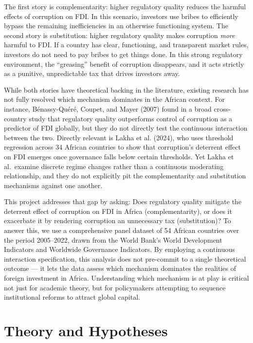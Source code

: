 \documentclass[
  12pt,
  letterpaper,
  DIV=11,
  numbers=noendperiod]{scrartcl}
\begin{document}
The first story is complementarity: higher regulatory quality reduces
the harmful effects of corruption on FDI. In this scenario, investors
use bribes to efficiently bypass the remaining inefficiencies in an
otherwise functioning system. The second story is substitution: higher
regulatory quality makes corruption \emph{more} harmful to FDI. If a
country has clear, functioning, and transparent market rules, investors
do not need to pay bribes to get things done. In this strong regulatory
environment, the ``greasing'' benefit of corruption disappears, and it
acts strictly as a punitive, unpredictable tax that drives investors
away.

While both stories have theoretical backing in the literature, existing
research has not fully resolved which mechanism dominates in the African
context. For instance, Bénassy-Quéré, Coupet, and Mayer (2007) found in
a broad cross-country study that regulatory quality outperforms control
of corruption as a predictor of FDI globally, but they do not directly
test the continuous interaction between the two. Directly relevant is
Lakha et al. (2024), who uses threshold regression across 34 African
countries to show that corruption's deterrent effect on FDI emerges once
governance falls below certain thresholds. Yet Lakha et al.~examine
discrete regime changes rather than a continuous moderating
relationship, and they do not explicitly pit the complementarity and
substitution mechanisms against one another.

This project addresses that gap by asking: Does regulatory quality
mitigate the deterrent effect of corruption on FDI in Africa
(complementarity), or does it exacerbate it by rendering corruption an
unnecessary tax (substitution)? To answer this, we use a comprehensive
panel dataset of 54 African countries over the period 2005--2022, drawn
from the World Bank's World Development Indicators and Worldwide
Governance Indicators. By employing a continuous interaction
specification, this analysis does not pre-commit to a single theoretical
outcome --- it lets the data assess which mechanism dominates the
realities of foreign investment in Africa. Understanding which mechanism
is at play is critical not just for academic theory, but for
policymakers attempting to sequence institutional reforms to attract
global capital.

\section{Theory and Hypotheses}\label{theory-and-hypotheses}
\end{document}
